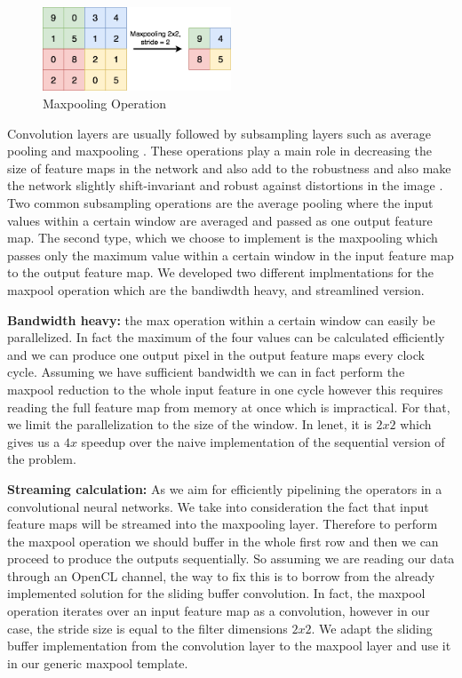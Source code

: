 \begin{figure}[h!]
\centering
\includegraphics[width=0.5\textwidth]{Figures/maxpool}
\decoRule
\caption[maxpool]{ Maxpooling Operation}
\label{fig:maxpool}
\end{figure}

Convolution layers are usually followed by subsampling layers such as average pooling and maxpooling \cite{lenet}. These operations play a main role in decreasing the size of feature maps in the network and also add to the robustness and also make the network slightly shift-invariant and robust against distortions in the image \cite{alexnet}. Two common subsampling operations are the average pooling where the input values within a certain window are averaged and passed as one output feature map. The second type, which we choose to implement is the maxpooling which passes only the maximum value within a certain window in the input feature map to the output feature map. We developed two different implmentations for the maxpool operation which are the bandiwdth heavy, and streamlined version. 

\textbf{Bandwidth heavy:} the max operation within a certain window can easily be parallelized. In fact the maximum of the four values can be calculated efficiently and we can produce one output pixel in the output feature maps every clock cycle. Assuming we have sufficient bandwidth we can in fact perform the maxpool reduction to the whole input feature in one cycle however this requires reading the full feature map from memory at once which is impractical. For that, we limit the parallelization to the size of the window. In lenet, it is $ 2x2 $ which gives us a $ 4x $ speedup over the naive implementation of the sequential version of the problem. 

\textbf{Streaming calculation:} As we aim for efficiently pipelining the operators in a convolutional neural networks. We take into consideration the fact that input feature maps will be streamed into the maxpooling layer. Therefore to perform the maxpool operation we should buffer in the whole first row and then we can proceed to produce the outputs sequentially. So assuming we are reading our data through an OpenCL channel, the way to fix this is to borrow from the already implemented solution for the sliding buffer convolution. In fact, the maxpool operation iterates over an input feature map as a convolution, however in our case, the stride size is equal to the filter dimensions $ 2x2 $. We adapt the sliding buffer implementation from the convolution layer to the maxpool layer and use it in our generic maxpool template. 

